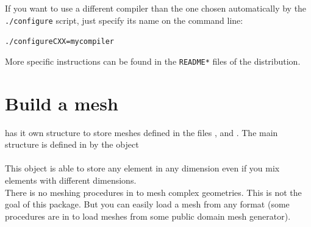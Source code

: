 \documentclass[11pt,a4paper]{article}
\begin{document}
If you want to use a different compiler than the one chosen
automatically by the \texttt{./configure} script, just specify its
name on the command line:
\begin{alltt}
  ./configure CXX=mycompiler
\end{alltt}
More specific instructions can be found in the \texttt{README*} files of
the distribution.

\section{Build a mesh}
\gf  has it own structure to store meshes defined in the files ,  and . The main structure is defined in  by the object\\[0.5cm]
\\[0.5cm]
This object is able to store any element in any dimension even if you mix elements with different dimensions.\\[0.5cm]

There is no meshing procedures in \gf  to mesh complex geometries. This is not the goal of this package. But you can easily load a mesh from any format (some procedures are in  to load meshes from some public domain mesh generator).
\end{document}
